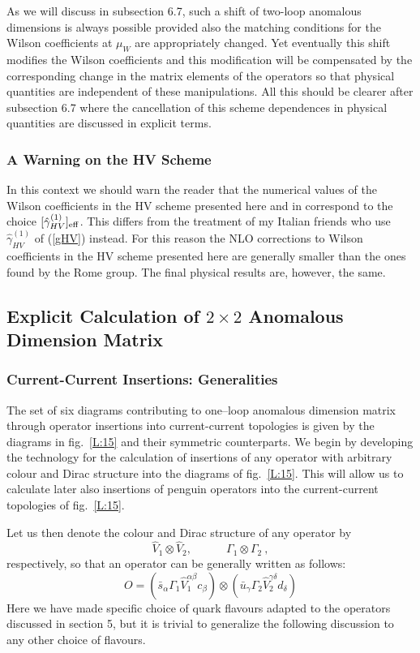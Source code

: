 \documentclass[12pt,rotate]{article}
\newcommand{\be}{\begin{equation}}
\newcommand{\ee}{\end{equation}}
\begin{document}
\begin{itemize}
\begin{itemize}
\begin{itemize}
As we will discuss in subsection 6.7,
such a shift of two-loop anomalous dimensions is always possible
provided also the matching conditions for the Wilson coefficients
at $\mu_W$ are appropriately changed. Yet eventually this shift
modifies the Wilson coefficients and this modification will be
compensated by the corresponding change in the matrix elements
of the operators so that physical quantities are independent
of these manipulations. All this should be clearer after
subsection 6.7 where the
cancellation of this scheme dependences in physical quantities are
discussed in explicit terms.
\subsubsection{A Warning on the HV Scheme}
In this context we should warn the reader that the numerical
values of the Wilson coefficients in the HV scheme presented here
and in \cite{BBL,BJLW}
 correspond to the choice $[\hat\gamma^{(1)}_{HV}]_{\rm eff}$.
This differs from the treatment of my Italian friends 
\cite{ROMA1,ROMA2} who use
$\hat\gamma^{(1)}_{HV}$ of (\ref{gHV}) instead. For this reason the
NLO corrections to Wilson coefficients in the HV scheme presented 
here are generally smaller
than the ones found by the Rome group. The final physical results
are, however, the same.
\subsection{Explicit Calculation of $2\times 2$ 
Anomalous Dimension Matrix}
\subsubsection{Current-Current Insertions: Generalities}
The set of six diagrams contributing to one--loop anomalous dimension 
matrix through operator
insertions into current-current topologies is given by the diagrams in 
fig.~\ref{L:15} and their symmetric counterparts.
We begin by developing the technology for the calculation of insertions
of any operator with arbitrary colour and Dirac structure into the
diagrams of fig.~\ref{L:15}. 
This will allow us to calculate later also insertions
of penguin operators into the current-current topologies of 
fig.~\ref{L:15}.

Let us then denote the colour and Dirac structure of any operator
by
\be\label{CD}
\hat V_1\otimes\hat V_2,\quad\quad\quad \Gamma_1\otimes\Gamma_2~,
\ee
respectively, so that an operator can be generally written as follows:
\be\label{OG}
O=(\bar s_\alpha \Gamma_1 \hat V_1^{\alpha\beta} c_\beta)\otimes 
  (\bar u_\gamma \Gamma_2 \hat V_2^{\gamma\delta} d_\delta)
\ee
Here we have made  specific choice of quark flavours adapted to the
operators discussed in section 5, but it is trivial to generalize
the following discussion to any other choice of flavours.


\end{itemize}
\end{itemize}
\end{itemize}
\end{document}
